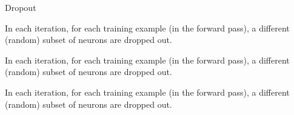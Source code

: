 \begin{vbframe}{Dropout}
\begin{figure}
  \end{figure}
\framebreak
  \begin{figure}
    \centering
  \end{figure}
  In each iteration, for each training example (in the forward pass), a different (random) subset of neurons are dropped out.
\framebreak
  \begin{figure}
    \centering
  \end{figure}
  In each iteration, for each training example (in the forward pass), a different (random) subset of neurons are dropped out.
\framebreak
  \begin{figure}
    \centering
  \end{figure}
  In each iteration, for each training example (in the forward pass), a different (random) subset of neurons are dropped out.
\end{vbframe}


